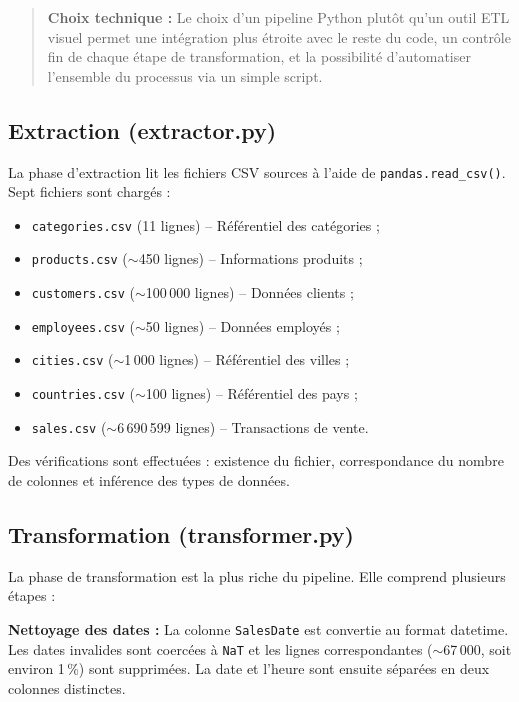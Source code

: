 \documentclass[12pt,a4paper,twoside]{report}
\begin{document}
\begin{quotation}
\noindent\textbf{Choix technique :}\newline
Le choix d'un pipeline Python plutôt qu'un outil ETL visuel permet une intégration plus étroite avec le reste du code, un contrôle fin de chaque étape de transformation, et la possibilité d'automatiser l'ensemble du processus via un simple script.
\end{quotation}

\subsection{Extraction (extractor.py)}

La phase d'extraction lit les fichiers CSV sources à l'aide de \texttt{pandas.read\_csv()}. Sept fichiers sont chargés :

\begin{itemize}
  \item \texttt{categories.csv} (11 lignes) -- Référentiel des catégories ;
  \item \texttt{products.csv} ($\sim$450 lignes) -- Informations produits ;
  \item \texttt{customers.csv} ($\sim$100\,000 lignes) -- Données clients ;
  \item \texttt{employees.csv} ($\sim$50 lignes) -- Données employés ;
  \item \texttt{cities.csv} ($\sim$1\,000 lignes) -- Référentiel des villes ;
  \item \texttt{countries.csv} ($\sim$100 lignes) -- Référentiel des pays ;
  \item \texttt{sales.csv} ($\sim$6\,690\,599 lignes) -- Transactions de vente.
\end{itemize}

Des vérifications sont effectuées : existence du fichier, correspondance du nombre de colonnes et inférence des types de données.

\subsection{Transformation (transformer.py)}

La phase de transformation est la plus riche du pipeline. Elle comprend plusieurs étapes :

\textbf{Nettoyage des dates :} La colonne \texttt{SalesDate} est convertie au format datetime. Les dates invalides sont coercées à \texttt{NaT} et les lignes correspondantes ($\sim$67\,000, soit environ 1\,\%) sont supprimées. La date et l'heure sont ensuite séparées en deux colonnes distinctes.
\end{document}
